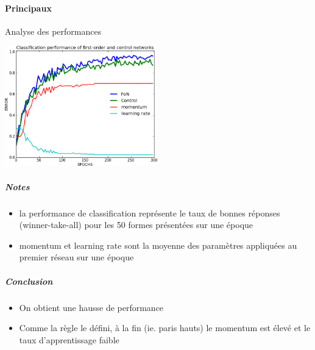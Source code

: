     \paragraph{Principaux}
      Analyse des performances
      \begin{center}
	\includegraphics[width=250px]{data/expD3/perff.png}
      \end{center}
      \subparagraph{Notes}
	\begin{itemize}
	  \item la performance de classification représente le taux de bonnes réponses (winner-take-all) pour les 50 formes présentées sur une époque
	  \item momentum et learning rate sont la moyenne des paramètres appliquées au premier réseau sur une époque
	\end{itemize}
      \subparagraph{Conclusion}
	\begin{itemize}
	  \item On obtient une hausse de performance
	  \item Comme la règle le défini, à la fin (ie. paris hauts) le momentum est élevé et le taux d'apprentissage faible
	\end{itemize}
